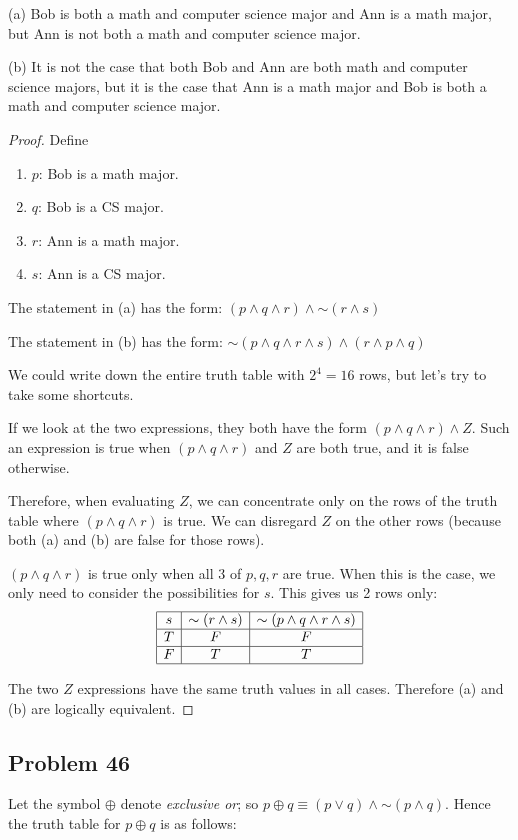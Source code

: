 \documentclass[14pt]{extarticle}
\begin{document}
(a)
Bob is both a math and computer science major and Ann is a math major, but Ann is not both a math and computer science major.

(b)
It is not the case that both Bob and Ann are both math and computer science majors, but it is the case that Ann is a math major and Bob is both a math and computer science major.

\begin{proof}
Define
\begin{enumerate}
\item $p$: Bob is a math major.
\item $q$: Bob is a CS major.
\item $r$: Ann is a math major.
\item $s$: Ann is a CS major.
\end{enumerate}

The statement in (a) has the form:
$(p \wedge q \wedge r) \wedge {\sim (r \wedge s)}$

The statement in (b) has the form:
${\sim (p \wedge q \wedge r \wedge s)} \wedge (r \wedge p \wedge q)$

We could write down the entire truth table with $2^4 = 16$ rows, but let's try to take some shortcuts.

If we look at the two expressions, they both have the form
$(p \wedge q \wedge r) \wedge Z$. Such an expression is true when $(p \wedge q \wedge r)$ and $Z$ are both true, and it is false otherwise.

Therefore, when evaluating $Z$, we can concentrate only on the rows of the truth table where $(p \wedge q \wedge r)$ is true. We can disregard $Z$ on the other rows (because both (a) and (b) are false for those rows).

$(p \wedge q \wedge r)$ is true only when all 3 of $p, q, r$ are true. When this is the case, we only need to consider the possibilities for $s$. This gives us 2 rows only:
$$
\begin{array}{|c|c|c|}
\hline
s & {\sim (r \wedge s)} & {\sim (p \wedge q \wedge r \wedge s)} \\
\hline
T & F & F \\
\hline
F & T & T \\
\hline
\end{array}
$$

The two $Z$ expressions have the same truth values in all cases. Therefore (a) and (b) are logically equivalent.
\end{proof}

\subsection{Problem 46}
Let the symbol $\oplus$ denote {\it exclusive or}; so $p \oplus q \equiv (p \vee q) \wedge {\sim(p \wedge q)}$. Hence the truth table for $p \oplus q$ is as follows:
\end{document}

